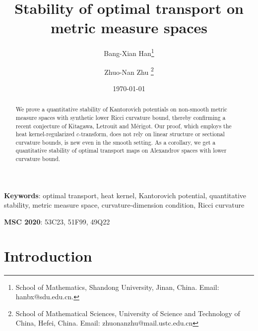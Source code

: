 \documentclass[a4paper,11pt]{article}
\title{{\bf Stability of optimal transport on metric measure spaces}
}
\numberwithin{equation}{section}
\theoremstyle{plain}
\theoremstyle{definition}
\theoremstyle{remark}
\begin{document}
	\author{Bang-Xian Han\thanks{School of   Mathematics,  Shandong University,  Jinan, China.  Email: hanbx@sdu.edu.cn. }
		\and Zhuo-Nan Zhu
		\thanks{School of Mathematical Sciences, University of Science and Technology of China, Hefei, China.  Email: zhuonanzhu@mail.ustc.edu.cn}
	}
	
	
	
	\date{\today} 
	\maketitle
	
	\begin{abstract}
		We prove  a quantitative  stability of Kantorovich potentials on non-smooth metric measure spaces with synthetic lower Ricci curvature bound,  thereby confirming a recent conjecture of  Kitagawa,  Letrouit and M\'erigot.   Our proof,  which employs the heat kernel-regularized $c$-transform,   does not rely on linear structure or  sectional curvature bounds,   is new even in the smooth setting.  
		As a corollary,  we get a quantitative stability of optimal transport maps on Alexandrov spaces with  lower curvature bound.  
		
	\end{abstract}
	
	
	\textbf{Keywords}: optimal transport,  heat kernel,  Kantorovich potential,  quantitative stability,  metric measure space,  curvature-dimension condition,  Ricci curvature
	
\textbf{MSC 2020}: 53C23, 51F99, 49Q22
	\setcounter{tocdepth}{1}
	\tableofcontents
	
	
	
	\section{Introduction}
\end{document}
